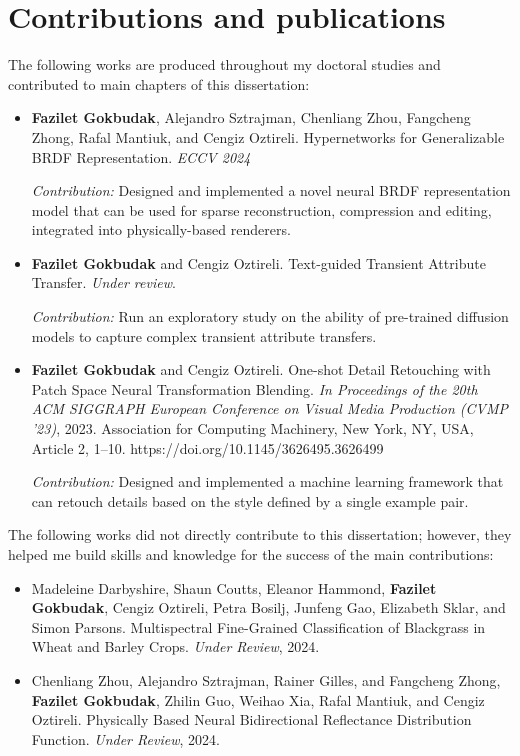 \section{Contributions and publications}

The following works are produced throughout my doctoral studies and contributed to main chapters of this dissertation:

\begin{itemize}

\item \textbf{Fazilet Gokbudak}, Alejandro Sztrajman, Chenliang Zhou,  Fangcheng Zhong, Rafal Mantiuk, and Cengiz Oztireli. Hypernetworks for Generalizable BRDF Representation. \textit{ECCV 2024}

\textit{Contribution:} Designed and implemented a novel neural BRDF representation model that can be used for sparse reconstruction, compression and editing, integrated into physically-based renderers.

\item \textbf{Fazilet Gokbudak} and Cengiz Oztireli. Text-guided Transient Attribute Transfer. \textit{Under review}.

\textit{Contribution:} Run an exploratory study on the ability of pre-trained diffusion models to capture complex transient attribute transfers.

\item \textbf{Fazilet Gokbudak} and Cengiz Oztireli. One-shot Detail Retouching with Patch Space Neural Transformation Blending. \textit{In Proceedings of the 20th ACM SIGGRAPH European Conference on Visual Media Production (CVMP '23)}, 2023. Association for Computing Machinery, New York, NY, USA, Article 2, 1–10. https://doi.org/10.1145/3626495.3626499

\textit{Contribution:} Designed and implemented a machine learning framework that can retouch details based on the style defined by a single example pair. 

\end{itemize}

The following works did not directly contribute to this dissertation; however, they helped me build skills and knowledge for the success of the main contributions:

\begin{itemize}

\item Madeleine Darbyshire, Shaun Coutts, Eleanor Hammond, \textbf{Fazilet Gokbudak}, Cengiz Oztireli, Petra Bosilj, Junfeng Gao, Elizabeth Sklar, and Simon Parsons. Multispectral Fine-Grained Classification of Blackgrass in Wheat and Barley Crops. \textit{Under Review}, 2024.

\item Chenliang Zhou, Alejandro Sztrajman, Rainer Gilles, and Fangcheng Zhong, \textbf{Fazilet Gokbudak}, Zhilin Guo, Weihao Xia, Rafal Mantiuk, and Cengiz Oztireli. Physically Based Neural Bidirectional Reflectance Distribution Function. \textit{Under Review}, 2024.

\end{itemize}